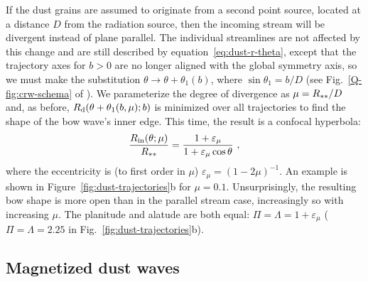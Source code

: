If the dust grains are assumed to originate from a second point
source, located at a distance \(D\) from the radiation source, then
the incoming stream will be divergent instead of plane parallel.  The
individual streamlines are not affected by this change and are still
described by equation~\eqref{eq:dust-r-theta}, except that the
trajectory axes for \(b > 0\) are no longer aligned with the global
symmetry axis, so we must make the substitution
\(\theta \to \theta + \theta_1(b)\), where \(\sin \theta_1 = b / D\) (see
Fig.~\ref{Q-fig:crw-schema} of \citealp{Tarango-Yong:2018a}). We
parameterize the degree of divergence as \(\mu = R_{**} / D\) and, as
before, \(R_{\text{d}}(\theta + \theta_1(b, \mu); b)\) is minimized over all
trajectories to find the shape of the bow wave's inner edge.  This
time, the result is a confocal hyperbola:
\begin{equation}
  \label{eq:dust-divergent-r-in}
  \frac{R_{\text{in}}(\theta; \mu)} {R_{**}} = \frac{1 + \varepsilon_\mu}{1 + \varepsilon_\mu\cos\theta} \ ,
\end{equation}
where the eccentricity is (to first order in \(\mu\))
\( \varepsilon_\mu = (1 - 2\mu)^{-1}\).  An example is shown in
Figure~\ref{fig:dust-trajectories}b for \(\mu = 0.1\).  Unsurprisingly,
the resulting bow shape is more open than in the parallel stream case,
increasingly so with increasing \(\mu\).  The planitude and alatude are
both equal: \(\Pi = \Lambda = 1 + \varepsilon_\mu\)
(\(\Pi = \Lambda = 2.25\) in Fig.~\ref{fig:dust-trajectories}b).

\subsection{Magnetized dust waves}
\label{sec:tight-magn-coupl}

